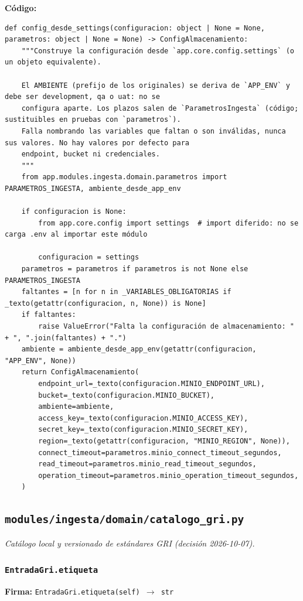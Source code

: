 \documentclass[11pt,a4paper]{article}
\begin{document}
\textbf{Código:}
\begin{lstlisting}
def config_desde_settings(configuracion: object | None = None, parametros: object | None = None) -> ConfigAlmacenamiento:
    """Construye la configuración desde `app.core.config.settings` (o un objeto equivalente).

    El AMBIENTE (prefijo de los originales) se deriva de `APP_ENV` y debe ser development, qa o uat: no se
    configura aparte. Los plazos salen de `ParametrosIngesta` (código; sustituibles en pruebas con `parametros`).
    Falla nombrando las variables que faltan o son inválidas, nunca sus valores. No hay valores por defecto para
    endpoint, bucket ni credenciales.
    """
    from app.modules.ingesta.domain.parametros import PARAMETROS_INGESTA, ambiente_desde_app_env

    if configuracion is None:
        from app.core.config import settings  # import diferido: no se carga .env al importar este módulo

        configuracion = settings
    parametros = parametros if parametros is not None else PARAMETROS_INGESTA
    faltantes = [n for n in _VARIABLES_OBLIGATORIAS if _texto(getattr(configuracion, n, None)) is None]
    if faltantes:
        raise ValueError("Falta la configuración de almacenamiento: " + ", ".join(faltantes) + ".")
    ambiente = ambiente_desde_app_env(getattr(configuracion, "APP_ENV", None))
    return ConfigAlmacenamiento(
        endpoint_url=_texto(configuracion.MINIO_ENDPOINT_URL),
        bucket=_texto(configuracion.MINIO_BUCKET),
        ambiente=ambiente,
        access_key=_texto(configuracion.MINIO_ACCESS_KEY),
        secret_key=_texto(configuracion.MINIO_SECRET_KEY),
        region=_texto(getattr(configuracion, "MINIO_REGION", None)),
        connect_timeout=parametros.minio_connect_timeout_segundos,
        read_timeout=parametros.minio_read_timeout_segundos,
        operation_timeout=parametros.minio_operation_timeout_segundos,
    )
\end{lstlisting}

\subsection{\texttt{modules/ingesta/domain/catalogo\_gri.py}}
\textit{Catálogo local y versionado de estándares GRI (decisión 2026-10-07).}

\subsubsection*{\texttt{EntradaGri.etiqueta}}
\textbf{Firma:} \texttt{EntradaGri.etiqueta(self) $\rightarrow$ str}
\end{document}
